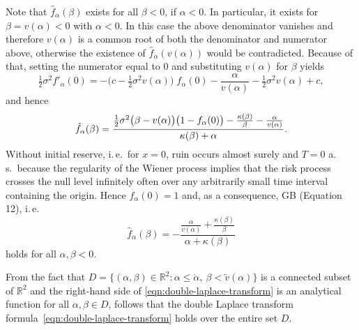 \documentclass[final]{article}
\makeatletter
\newcommand*{\1}{\mathbb{1}}
\newcommand*{\R}{\mathbb{R}}
\renewenvironment{proof}[1][\proofname]{\par\pushQED{\qed}\normalfont\topsep6\p@\@plus6\p@\relax\trivlist\item[\hskip\labelsep\bfseries#1\@addpunct{.}]\ignorespaces}{\popQED\endtrivlist\@endpefalse}
\makeatother
\begin{document}
\begin{proof}[Proof of Theorem~2.1]
    Note that $\hat{f}_{\alpha}(\beta)$ exists for all $\beta < 0$, if $\alpha < 0$.  In
    particular, it exists for $\beta = v(\alpha) < 0$ with $\alpha < 0$.  In this case the
    above denominator vanishes and therefore $v(\alpha)$ is a common root of both the
    denominator and numerator above, otherwise the existence of
    $\hat{f}_{\alpha}(v(\alpha))$ would be contradicted.  Because of that, setting the
    numerator equal to $0$ and substituting $v(\alpha)$ for $\beta$ yields
    \begin{equation*}
        \tfrac{1}{2}\sigma^{2} f'_{\alpha}(0) =
            - \bigl(c - \tfrac{1}{2}\sigma^{2} v(\alpha)\bigr)\;f_{\alpha}(0)
            - \frac{\alpha}{v(\alpha)} - \tfrac{1}{2}\sigma^{2} v(\alpha) + c,
    \end{equation*}
    and hence
    \begin{equation*}
        \hat{f}_{\alpha}(\beta) = \frac{%
            \frac{1}{2}\sigma^{2} \bigl(\beta - v(\alpha)\bigr) \bigl(1 - f_{\alpha}(0)\bigr)
            - \frac{\kappa(\beta)}{\beta} - \frac{\alpha}{v(\alpha)}
        }{%
            \kappa(\beta) + \alpha
        }.
    \end{equation*}
    Without initial reserve, i.\,e.\ for $x = 0$, ruin occurs almost surely and $T = 0$
    a.\,s.\ because the regularity of the Wiener process implies that the risk process
    crosses the null level infinitely often over any arbitrarily small time interval
    containing the origin.  Hence $f_{\alpha}(0) = 1$ and, as a consequence, GB (Equation
    12), i.\,e.
    \begin{equation}
        \hat{f}_{\alpha}(\beta) =
            -\frac{
                \frac{\alpha}{v(\alpha)} + \frac{\kappa(\beta)}{\beta}
            }{
                \alpha + \kappa(\beta)
            }
    \label{eqn:double-laplace-transform}
    \end{equation}
    holds for all $\alpha, \beta < 0$.

    From the fact that
        $D = \{(\alpha, \beta) \in \R^{2}\colon \alpha \le \mathring{\alpha},\ \beta < \tilde{v}(\alpha)\}$
    is a connected subset of $\R^{2}$ and the right-hand side of
    \eqref{eqn:double-laplace-transform} is an analytical function for all $\alpha, \beta
    \in D$, follows that the double Laplace transform
    formula~\eqref{eqn:double-laplace-transform} holds over the entire set $D$.
\end{proof}
\end{document}
